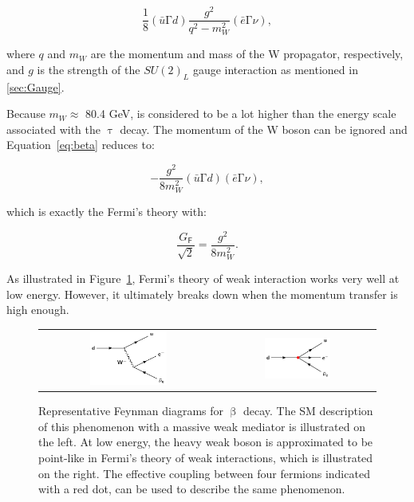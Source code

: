 \begin{equation}
\label{eq:beta}
\frac{1}{8}(\bar{u}\mathrm{\Gamma}d)\frac{g^2}{q^2-m_{W}^2}(\bar{e}\mathrm{\Gamma}\nu),
\end{equation}

where $q$ and $m_W$ are the momentum and mass of the W propagator, respectively, and $g$ is the strength of the $SU(2)_{L}$ gauge interaction as mentioned in \autoref{sec:Gauge}.

Because $m_W\approx$ 80.4 GeV, is considered to be a lot higher than the energy scale associated with the $\uptau$ decay. The momentum of the W boson can be ignored and Equation~\ref{eq:beta} reduces to:

\begin{equation}
\label{eq:beta2}
-\frac{g^2}{8m_{W}^2}(\bar{u}\mathrm{\Gamma}d)(\bar{e}\mathrm{\Gamma}\nu),
\end{equation}

which is exactly the Fermi's theory with:

\begin{equation}
\frac{G_{\textsf{F}}}{\sqrt{2}}=\frac{g^2}{8m_{W}^2}.
\end{equation}

As illustrated in Figure~\ref{fig:FermiEFT}, Fermi's theory of weak interaction works very well at low energy. However, it ultimately breaks down when the momentum transfer is high enough. 

\begin{figure}[tbh!]
 \begin{center}
 \begin{tabular}{cc}
 \includegraphics[width=0.45\textwidth]{figures/Part1/EFT/BetaDecay}&
 \includegraphics[width=0.45\textwidth]{figures/Part1/EFT/FermiTheory}\\
 \end{tabular}
 \caption{Representative Feynman diagrams for $\upbeta$ decay. The \ac{SM} description of this phenomenon with a massive weak mediator is illustrated on the left. At low energy, the heavy weak boson is approximated to be point-like in Fermi's theory of weak interactions, which is illustrated on the right. The effective coupling between four fermions indicated with a red dot, can be used to describe the same phenomenon.}
 \label{fig:FermiEFT}
 \end{center}
\end{figure}


